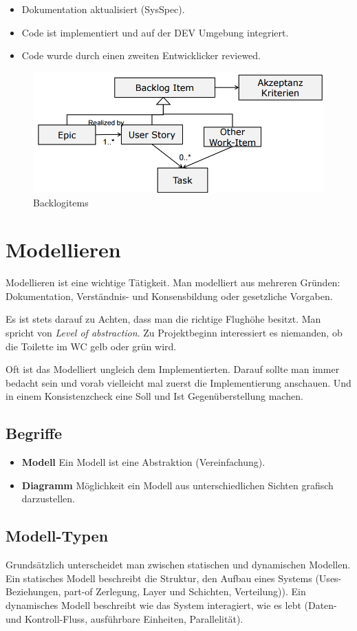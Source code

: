 \begin{itemize}
	\item Dokumentation aktualisiert (SysSpec).
	\item Code ist implementiert und auf der DEV Umgebung integriert.
	\item Code wurde durch einen zweiten Entwicklicker reviewed.
\end{itemize}

\begin{figure}
\centering
\includegraphics[width=0.7\linewidth]{fig/backlogitems}
\caption{Backlogitems}
\label{fig:backlogitems}
\end{figure}

\section{Modellieren}
Modellieren ist eine wichtige Tätigkeit. Man modelliert aus mehreren Gründen: Dokumentation, Verständnis- und Konsensbildung oder gesetzliche Vorgaben.

Es ist stets darauf zu Achten, dass man die richtige Flughöhe besitzt. Man spricht von \emph{Level of abstraction}. Zu Projektbeginn interessiert es niemanden, ob die Toilette im WC gelb oder grün wird. 

Oft ist das Modelliert ungleich dem Implementierten. Darauf sollte man immer bedacht sein und vorab vielleicht mal zuerst die Implementierung anschauen. Und in einem Konsistenzcheck eine Soll und Ist Gegenüberstellung machen.

\subsection{Begriffe}
\begin{itemize}
	\item \textbf{Modell} Ein Modell ist eine Abstraktion (Vereinfachung).
	\item \textbf{Diagramm} Möglichkeit ein Modell aus unterschiedlichen Sichten grafisch darzustellen.
\end{itemize}

\subsection{Modell-Typen}
Grundsätzlich unterscheidet man zwischen statischen und dynamischen Modellen. Ein statisches Modell beschreibt die Struktur, den Aufbau eines Systems (Uses-Beziehungen, part-of Zerlegung, Layer und Schichten, Verteilung)). Ein dynamisches Modell beschreibt wie das System interagiert, wie es lebt  (Daten- und Kontroll-Fluss, ausführbare Einheiten, Parallelität).

